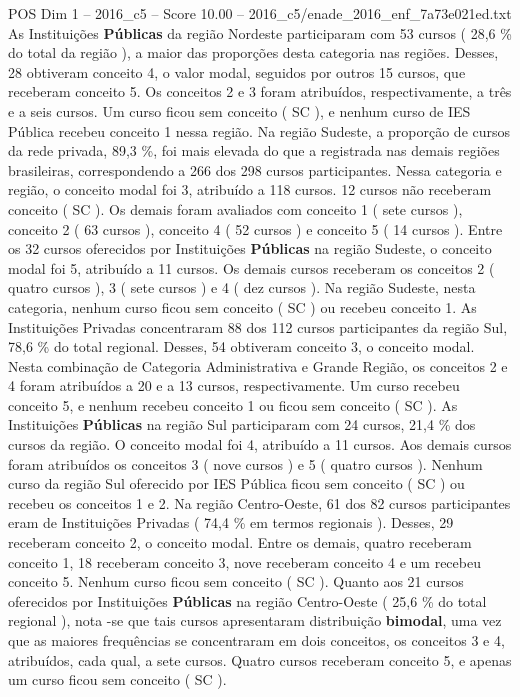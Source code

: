 \begin{textsample}{POS Dim 1 – 2016\_c5 – Score 10.00 – 2016\_c5/enade\_2016\_enf\_7a73e021ed.txt}
As Instituições \textbf{Públicas} da região Nordeste participaram com 53 cursos ( 28,6 \% do total da região ), a maior das proporções desta categoria nas regiões.
Desses, 28 obtiveram conceito 4, o valor modal, seguidos por outros 15 cursos, que receberam conceito 5.
Os conceitos 2 e 3 foram atribuídos, respectivamente, a três e a seis cursos.
Um curso ficou sem conceito ( SC ), e nenhum curso de IES Pública recebeu conceito 1 nessa região.
Na região Sudeste, a proporção de cursos da rede privada, 89,3 \%, foi mais elevada do que a registrada nas demais regiões brasileiras, correspondendo a 266 dos 298 cursos participantes.
Nessa categoria e região, o conceito modal foi 3, atribuído a 118 cursos. 12 cursos não receberam conceito ( SC ).
Os demais foram avaliados com conceito 1 ( sete cursos ), conceito 2 ( 63 cursos ), conceito 4 ( 52 cursos ) e conceito 5 ( 14 cursos ).
Entre os 32 cursos oferecidos por Instituições \textbf{Públicas} na região Sudeste, o conceito modal foi 5, atribuído a 11 cursos.
Os demais cursos receberam os conceitos 2 ( quatro cursos ), 3 ( sete cursos ) e 4 ( dez cursos ).
Na região Sudeste, nesta categoria, nenhum curso ficou sem conceito ( SC ) ou recebeu conceito 1.
As Instituições Privadas concentraram 88 dos 112 cursos participantes da região Sul, 78,6 \% do total regional.
Desses, 54 obtiveram conceito 3, o conceito modal.
Nesta combinação de Categoria Administrativa e Grande Região, os conceitos 2 e 4 foram atribuídos a 20 e a 13 cursos, respectivamente.
Um curso recebeu conceito 5, e nenhum recebeu conceito 1 ou ficou sem conceito ( SC ).
As Instituições \textbf{Públicas} na região Sul participaram com 24 cursos, 21,4 \% dos cursos da região.
O conceito modal foi 4, atribuído a 11 cursos.
Aos demais cursos foram atribuídos os conceitos 3 ( nove cursos ) e 5 ( quatro cursos ).
Nenhum curso da região Sul oferecido por IES Pública ficou sem conceito ( SC ) ou recebeu os conceitos 1 e 2.
Na região Centro-Oeste, 61 dos 82 cursos participantes eram de Instituições Privadas ( 74,4 \% em termos regionais ).
Desses, 29 receberam conceito 2, o conceito modal.
Entre os demais, quatro receberam conceito 1, 18 receberam conceito 3, nove receberam conceito 4 e um recebeu conceito 5.
Nenhum curso ficou sem conceito ( SC ).
Quanto aos 21 cursos oferecidos por Instituições \textbf{Públicas} na região Centro-Oeste ( 25,6 \% do total regional ), nota -se que tais cursos apresentaram distribuição \textbf{bimodal}, uma vez que as maiores frequências se concentraram em dois conceitos, os conceitos 3 e 4, atribuídos, cada qual, a sete cursos.
Quatro cursos receberam conceito 5, e apenas um curso ficou sem conceito ( SC ).

\end{textsample}
